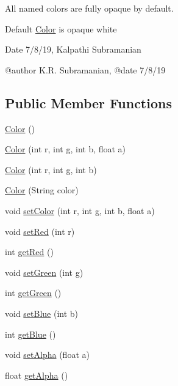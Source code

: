 All named colors are fully opaque by default.

Default \hyperlink{classbridges_1_1base_1_1_color}{Color} is opaque white

\begin{DoxyDate}{Date}
7/8/19, Kalpathi Subramanian
\end{DoxyDate}
\begin{DoxyVerb}@author K.R. Subramanian,
@date 7/8/19\end{DoxyVerb}
 \subsection*{Public Member Functions}
\begin{DoxyCompactItemize}
\item 
\hyperlink{classbridges_1_1base_1_1_color_ab6d71ac2ee1430fb2db2fbe34e692de8}{Color} ()
\item 
\hyperlink{classbridges_1_1base_1_1_color_a15f56590ca3c9cc161c7bfa47060ad21}{Color} (int r, int g, int b, float a)
\item 
\hyperlink{classbridges_1_1base_1_1_color_a5fab564fa4eec8bece64f847ebd42948}{Color} (int r, int g, int b)
\item 
\hyperlink{classbridges_1_1base_1_1_color_a5cb17fdf8eddf44fc0763ceb7d4d833b}{Color} (String color)
\item 
void \hyperlink{classbridges_1_1base_1_1_color_a5559b1c7eb4c3901526b1012029b528f}{set\+Color} (int r, int g, int b, float a)
\item 
void \hyperlink{classbridges_1_1base_1_1_color_a1d78967703924b709e76def5b2b3ee9a}{set\+Red} (int r)
\item 
int \hyperlink{classbridges_1_1base_1_1_color_af1a30dc925b35d6bfe609f8838651025}{get\+Red} ()
\item 
void \hyperlink{classbridges_1_1base_1_1_color_a415a28133ade4e216c02ecdfc8a32a1d}{set\+Green} (int g)
\item 
int \hyperlink{classbridges_1_1base_1_1_color_a8f3fdd23cf785704faa2e3701e25978f}{get\+Green} ()
\item 
void \hyperlink{classbridges_1_1base_1_1_color_a0e04156b1573cf8002c4d9cb69825657}{set\+Blue} (int b)
\item 
int \hyperlink{classbridges_1_1base_1_1_color_ad4b82e1eb9ff59857d2868edd8d4ce65}{get\+Blue} ()
\item 
void \hyperlink{classbridges_1_1base_1_1_color_afab07ce64efa1fa5797795670b0effb6}{set\+Alpha} (float a)
\item 
float \hyperlink{classbridges_1_1base_1_1_color_a7c4247e31ecd8fcc61ef208d5deefe68}{get\+Alpha} ()

\end{DoxyCompactItemize}

